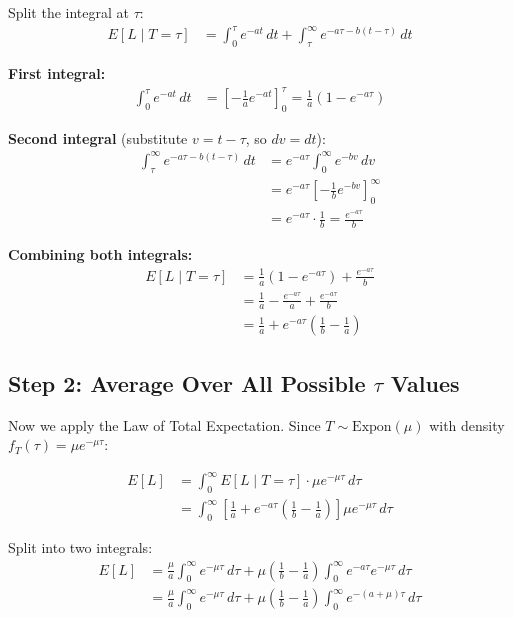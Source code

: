 \documentclass[11pt]{article}
\begin{document}
Split the integral at $\tau$:
\begin{align*}
E[L \mid T = \tau] &= \int_0^\tau e^{-at} \, dt + \int_\tau^\infty e^{-a\tau - b(t-\tau)} \, dt
\end{align*}

\textbf{First integral:}
\begin{align*}
\int_0^\tau e^{-at} \, dt &= \left[-\frac{1}{a}e^{-at}\right]_0^\tau = \frac{1}{a}(1 - e^{-a\tau})
\end{align*}

\textbf{Second integral} (substitute $v = t - \tau$, so $dv = dt$):
\begin{align*}
\int_\tau^\infty e^{-a\tau - b(t-\tau)} \, dt &= e^{-a\tau} \int_0^\infty e^{-bv} \, dv \\
&= e^{-a\tau} \left[-\frac{1}{b}e^{-bv}\right]_0^\infty \\
&= e^{-a\tau} \cdot \frac{1}{b} = \frac{e^{-a\tau}}{b}
\end{align*}

\textbf{Combining both integrals:}
\begin{align*}
E[L \mid T = \tau] &= \frac{1}{a}(1 - e^{-a\tau}) + \frac{e^{-a\tau}}{b} \\
&= \frac{1}{a} - \frac{e^{-a\tau}}{a} + \frac{e^{-a\tau}}{b} \\
&= \frac{1}{a} + e^{-a\tau}\left(\frac{1}{b} - \frac{1}{a}\right)
\end{align*}

\subsection*{Step 2: Average Over All Possible $\tau$ Values}

Now we apply the Law of Total Expectation. Since $T \sim \text{Expon}(\mu)$ with density $f_T(\tau) = \mu e^{-\mu\tau}$:

\begin{align*}
E[L] &= \int_0^\infty E[L \mid T = \tau] \cdot \mu e^{-\mu\tau} \, d\tau \\
&= \int_0^\infty \left[\frac{1}{a} + e^{-a\tau}\left(\frac{1}{b} - \frac{1}{a}\right)\right] \mu e^{-\mu\tau} \, d\tau
\end{align*}

Split into two integrals:
\begin{align*}
E[L] &= \frac{\mu}{a} \int_0^\infty e^{-\mu\tau} \, d\tau + \mu\left(\frac{1}{b} - \frac{1}{a}\right) \int_0^\infty e^{-a\tau}e^{-\mu\tau} \, d\tau \\
&= \frac{\mu}{a} \int_0^\infty e^{-\mu\tau} \, d\tau + \mu\left(\frac{1}{b} - \frac{1}{a}\right) \int_0^\infty e^{-(a+\mu)\tau} \, d\tau
\end{align*}
\end{document}
